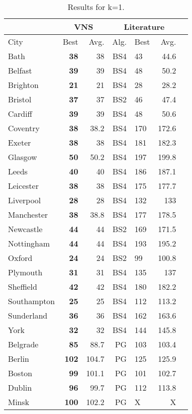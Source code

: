 \documentclass[dvipsnames,format=sigconf,anonymous=true,review=true]{acmart}
\begin{document}
 
  \begin{table}
  	\caption{Results for k=1.}
  	\label{tab:k1}  
 	\begin{tabular}{l|rr|rlrr}
 	\hline
 	\multicolumn{1}{c}{ } & \multicolumn{2}{|c}{VNS} & \multicolumn{3}{|c}{Literature} \\
 	\hline
	City & Best & Avg. & Alg. & Best & Avg. \\ \hline
	Bath&\bf{38}&38&BS4&43&44.6\\
	Belfast&\bf{39}&39&BS4&48&50.2\\
	Brighton&\bf{21}&21&BS4&28&28.2\\
	Bristol&\bf{37}&37&BS2&46&47.4\\
	Cardiff&\bf{39}&39&BS4&48&50.6\\
	Coventry&\bf{38}&38.2&BS4&170&172.6\\
	Exeter&\bf{38}&38&BS4&181&182.3\\
	Glasgow&\bf{50}&50.2&BS4&197&199.8\\
	Leeds&\bf{40}&40&BS4&186&187.1\\
	Leicester&\bf{38}&38&BS4&175&177.7\\
	Liverpool&\bf{28}&28&BS4&132&133\\
	Manchester&\bf{38}&38.8&BS4&177&178.5\\
	Newcastle&\bf{44}&44&BS2&169&171.5\\
	Nottingham&\bf{44}&44&BS4&193&195.2\\
	Oxford&\bf{24}&24&BS2&99&100.8\\
	Plymouth&\bf{31}&31&BS4&135&137\\
	Sheffield&\bf{42}&42&BS4&180&182.2\\
	Southampton&\bf{25}&25&BS4&112&113.2\\
	Sunderland&\bf{36}&36&BS4&162&163.6\\
	York&\bf{32}&32&BS4&144&145.8\\ \hline \hline
	Belgrade&\bf{85}&88.7&PG&103&103.4\\
	Berlin&\bf{102}&104.7&PG&125&125.9\\
	Boston&\bf{99}&101.1&PG&101&102.7\\
	Dublin&\bf{96}&99.7&PG&112&113.8\\
	Minsk&\bf{100}&102.2&PG&X&X\\
	\hline
	
 	\end{tabular}
 \end{table}
\end{document}
